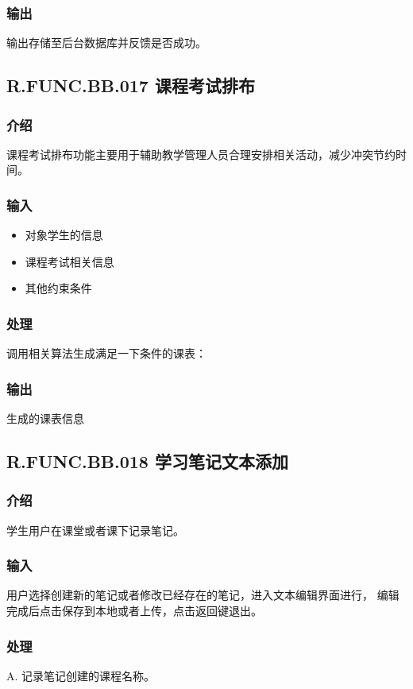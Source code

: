     \subsubsection{输出}
    输出存储至后台数据库并反馈是否成功。

  \subsection{R.FUNC.BB.017 课程考试排布}
    \subsubsection{介绍}
    课程考试排布功能主要用于辅助教学管理人员合理安排相关活动，减少冲突节约时间。
    \subsubsection{输入}
    \begin{itemize}
      \item 对象学生的信息
      \item 课程考试相关信息
      \item 其他约束条件
    \end{itemize}
    \subsubsection{处理}
    调用相关算法生成满足一下条件的课表：
    \subsubsection{输出}
    生成的课表信息


 \subsection{R.FUNC.BB.018 学习笔记文本添加}
    \subsubsection{介绍}
	学生用户在课堂或者课下记录笔记。
    \subsubsection{输入}
	用户选择创建新的笔记或者修改已经存在的笔记，进入文本编辑界面进行，
编辑完成后点击保存到本地或者上传，点击返回键退出。
    \subsubsection{处理}
	A. 记录笔记创建的课程名称。

